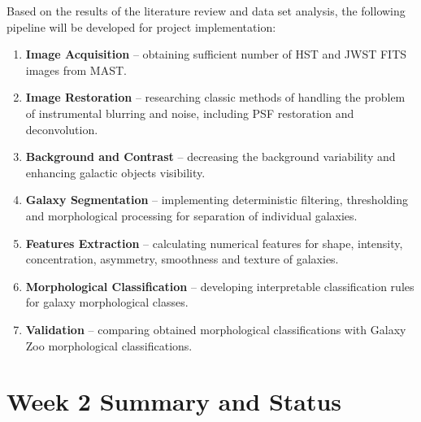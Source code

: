 \documentclass[11pt]{article}
\begin{document}
Based on the results of the literature review and data set analysis, the following pipeline will be developed for project implementation:
\begin{enumerate}
    \item \textbf{Image Acquisition} – obtaining sufficient number of HST and JWST FITS images from MAST.
    
    \item \textbf{Image Restoration} – researching classic methods of handling the problem of instrumental blurring and noise, including PSF restoration and deconvolution.
    
    \item \textbf{Background and Contrast} – decreasing the background variability and enhancing galactic objects visibility.
    
    \item \textbf{Galaxy Segmentation} – implementing deterministic filtering, thresholding and morphological processing for separation of individual galaxies.
    
    \item \textbf{Features Extraction} – calculating numerical features for shape, intensity, concentration, asymmetry, smoothness and texture of galaxies.
    
    \item \textbf{Morphological Classification} – developing interpretable classification rules for galaxy morphological classes.

    \item \textbf{Validation} – comparing obtained morphological classifications with Galaxy Zoo morphological classifications.
\end{enumerate}




\section{Week 2 Summary and Status}
\end{document}
